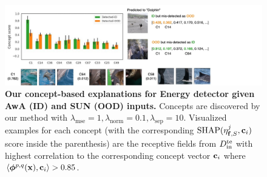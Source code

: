 \fi

%

\iffalse

\begin{figure}[tb]
\vspace{-5mm}
\includegraphics[scale=0.35]{figures/expl_dolphin.png}
\caption{
\small \textbf{Our concept-based explanations for Energy detector given AwA (ID) and SUN (OOD) inputs.} Concepts are discovered by our method with $\lambda_\textrm{mse} = 1, \lambda_\textrm{norm} = 0.1, \lambda_\textrm{sep} = 10$.
Visualized examples for each concept (with the corresponding $\textrm{SHAP}(\eta^{j}_{\mathbf{f}, S}, 
    \mathbf{c}_i)$ score inside the parenthesis) are the receptive fields from $D_{\textrm{in}}^{\textrm{te}}$ with highest correlation to the corresponding concept vector $\mathbf{c}_i$ where $\langle \bm{\phi}^{p,q}(\mathbf{x}), \mathbf{c}_i \rangle > 0.85$.
\vspace{-5mm}
}
\label{fig:expl_dolphin}
\end{figure}

